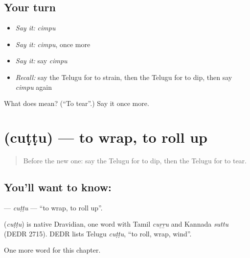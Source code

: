 \subsection*{Your turn}
\begin{itemize}
\raggedright
  \item \emph{Say it:} \emph{cimpu}
  \item \emph{Say it:} \emph{cimpu}, once more
  \item \emph{Say it:} say \emph{cimpu}
  \item \emph{Recall:} say the Telugu for to strain, then the Telugu for to dip, then say \emph{cimpu} again
\end{itemize}

\begin{tcolorbox}[breakable,colback=teal!4,colframe=teal!35!black,title={Before you move on}]
What does  mean? (\textquotedblleft{}To tear\textquotedblright{}.) Say it once more.
\end{tcolorbox}
\section[\texorpdfstring{\te{చుట్టు} (cuṭṭu)}{చుట్టు (cuṭṭu)}]{ (cuṭṭu) — to wrap, to roll up}

\label{lesson:TE-C164-cuttu}



\begin{quote}
Before the new one: say the Telugu for to dip, then the Telugu for to tear.
\end{quote}

\subsection*{You'll want to know: }
\textbf{} — \emph{cuṭṭu} — \textquotedblleft{}to wrap, to roll up\textquotedblright{}.

\begin{cousinweb}
\textbf{} (\emph{cuṭṭu}) is native Dravidian, one word with Tamil \emph{cuṟṟu} and Kannada \emph{suttu} (DEDR 2715). DEDR lists Telugu \emph{cuṭṭu}, \textquotedblleft{}to roll, wrap, wind\textquotedblright{}.
\end{cousinweb}

\begin{grammarlens}[title={What you've built}]
One more word for this chapter.
\end{grammarlens}


